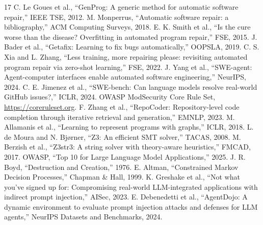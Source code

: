 \documentclass[10pt,a4paper]{article}
\begin{document}
\small
\begin{thebibliography}{17}
 C. Le Goues et al., ``GenProg: A generic method for automatic software repair,'' IEEE TSE, 2012.
 M. Monperrus, ``Automatic software repair: a bibliography,'' ACM Computing Surveys, 2018.
 E. K. Smith et al., ``Is the cure worse than the disease? Overfitting in automated program repair,'' FSE, 2015.
 J. Bader et al., ``Getafix: Learning to fix bugs automatically,'' OOPSLA, 2019.
 C. S. Xia and L. Zhang, ``Less training, more repairing please: revisiting automated program repair via zero-shot learning,'' FSE, 2022.
 J. Yang et al., ``SWE-agent: Agent-computer interfaces enable automated software engineering,'' NeurIPS, 2024.
 C. E. Jimenez et al., ``SWE-bench: Can language models resolve real-world GitHub issues?,'' ICLR, 2024.
 OWASP ModSecurity Core Rule Set, \url{https://coreruleset.org}.
 F. Zhang et al., ``RepoCoder: Repository-level code completion through iterative retrieval and generation,'' EMNLP, 2023.
 M. Allamanis et al., ``Learning to represent programs with graphs,'' ICLR, 2018.
 L. de Moura and N. Bjørner, ``Z3: An efficient SMT solver,'' TACAS, 2008.
 M. Berzish et al., ``Z3str3: A string solver with theory-aware heuristics,'' FMCAD, 2017.
 OWASP, ``Top 10 for Large Language Model Applications,'' 2025.
 J. R. Boyd, ``Destruction and Creation,'' 1976.
 E. Altman, ``Constrained Markov Decision Processes,'' Chapman \& Hall, 1999.
 K. Greshake et al., ``Not what you've signed up for: Compromising real-world LLM-integrated applications with indirect prompt injection,'' AISec, 2023.
 E. Debenedetti et al., ``AgentDojo: A dynamic environment to evaluate prompt injection attacks and defenses for LLM agents,'' NeurIPS Datasets and Benchmarks, 2024.
\end{thebibliography}
\end{document}
